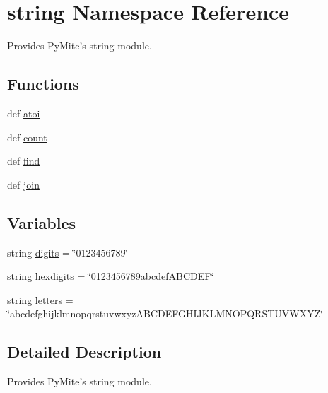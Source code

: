\hypertarget{namespacestring}{\section{string Namespace Reference}
\label{namespacestring}
}


Provides Py\-Mite's string module.  


\subsection*{Functions}
\begin{DoxyCompactItemize}
\item 
def \hyperlink{namespacestring_a50fe3b7796f9e51ae833a1f4f812132c}{atoi}
\item 
def \hyperlink{namespacestring_ad6aec6f0982de66a4c1d3e737bc9ee80}{count}
\item 
def \hyperlink{namespacestring_af1d551a6a31bb5ebb75988b603b8edbd}{find}
\item 
def \hyperlink{namespacestring_aacab35511a4384892626ee960868777f}{join}
\end{DoxyCompactItemize}
\subsection*{Variables}
\begin{DoxyCompactItemize}
\item 
string \hyperlink{namespacestring_aee808fa2139026484af927957ed5633f}{digits} = \char`\"{}0123456789\char`\"{}
\item 
string \hyperlink{namespacestring_a529be5ca3e660d5529dd7c543d5d93ca}{hexdigits} = \char`\"{}0123456789abcdef\-A\-B\-C\-D\-E\-F\char`\"{}
\item 
string \hyperlink{namespacestring_a6c44b858e17ad0eb81b82cc34119f3e1}{letters} = \char`\"{}abcdefghijklmnopqrstuvwxyz\-A\-B\-C\-D\-E\-F\-G\-H\-I\-J\-K\-L\-M\-N\-O\-P\-Q\-R\-S\-T\-U\-V\-W\-X\-Y\-Z\char`\"{}
\end{DoxyCompactItemize}


\subsection{Detailed Description}
Provides Py\-Mite's string module. 

